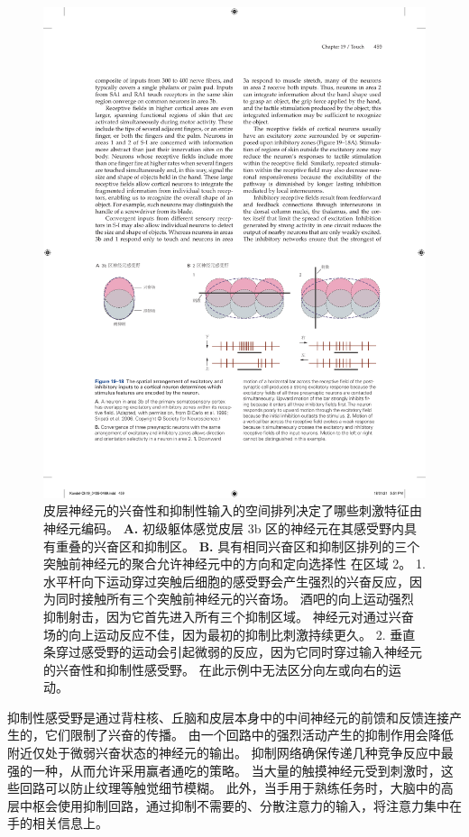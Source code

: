 \begin{figure}[htbp]
	\centering
	\includegraphics[width=1.0\linewidth]{chap19/fig_19_18}
	\caption{皮层神经元的兴奋性和抑制性输入的空间排列决定了哪些刺激特征由神经元编码。
		\textbf{A.} 初级躯体感觉皮层 3b 区的神经元在其感受野内具有重叠的兴奋区和抑制区\cite{dicarlo1998structure,sripati2006spatiotemporal}。
		\textbf{B.} 具有相同兴奋区和抑制区排列的三个突触前神经元的聚合允许神经元中的方向和定向选择性 在区域 2。 
		1. 水平杆向下运动穿过突触后细胞的感受野会产生强烈的兴奋反应，因为同时接触所有三个突触前神经元的兴奋场。
		酒吧的向上运动强烈抑制射击，因为它首先进入所有三个抑制区域。
		神经元对通过兴奋场的向上运动反应不佳，因为最初的抑制比刺激持续更久。
		2. 垂直条穿过感受野的运动会引起微弱的反应，因为它同时穿过输入神经元的兴奋性和抑制性感受野。
		在此示例中无法区分向左或向右的运动。}
	\label{fig:19_18}
\end{figure}


抑制性感受野是通过背柱核、丘脑和皮层本身中的中间神经元的前馈和反馈连接产生的，它们限制了兴奋的传播。 
由一个回路中的强烈活动产生的抑制作用会降低附近仅处于微弱兴奋状态的神经元的输出。
抑制网络确保传递几种竞争反应中最强的一种，从而允许采用赢者通吃的策略。
当大量的触摸神经元受到刺激时，这些回路可以防止纹理等触觉细节模糊。
此外，当手用于熟练任务时，大脑中的高层中枢会使用抑制回路，通过抑制不需要的、分散注意力的输入，将注意力集中在手的相关信息上。


